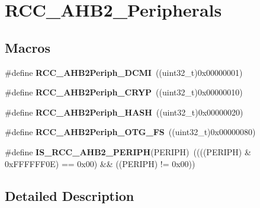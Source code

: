 \hypertarget{group___r_c_c___a_h_b2___peripherals}{}\section{R\+C\+C\+\_\+\+A\+H\+B2\+\_\+\+Peripherals}
\label{group___r_c_c___a_h_b2___peripherals}
\subsection*{Macros}
\begin{DoxyCompactItemize}
\item 
\mbox{\label{group___r_c_c___a_h_b2___peripherals_ga514e63d5f3ced29ca4014d84e269ea6e}} 
\#define {\bfseries R\+C\+C\+\_\+\+A\+H\+B2\+Periph\+\_\+\+D\+C\+MI}~((uint32\+\_\+t)0x00000001)
\item 
\mbox{\label{group___r_c_c___a_h_b2___peripherals_ga99893bb6ef0cc504fbbc6236ae883410}} 
\#define {\bfseries R\+C\+C\+\_\+\+A\+H\+B2\+Periph\+\_\+\+C\+R\+YP}~((uint32\+\_\+t)0x00000010)
\item 
\mbox{\label{group___r_c_c___a_h_b2___peripherals_gad235f25cf07339b1486e95adf4e2111c}} 
\#define {\bfseries R\+C\+C\+\_\+\+A\+H\+B2\+Periph\+\_\+\+H\+A\+SH}~((uint32\+\_\+t)0x00000020)
\item 
\mbox{\label{group___r_c_c___a_h_b2___peripherals_ga95977679051aa7428d823404bff63aea}} 
\#define {\bfseries R\+C\+C\+\_\+\+A\+H\+B2\+Periph\+\_\+\+O\+T\+G\+\_\+\+FS}~((uint32\+\_\+t)0x00000080)
\item 
\mbox{\label{group___r_c_c___a_h_b2___peripherals_ga90f3f337a5f503e36280ab4504d31c39}} 
\#define {\bfseries I\+S\+\_\+\+R\+C\+C\+\_\+\+A\+H\+B2\+\_\+\+P\+E\+R\+I\+PH}(P\+E\+R\+I\+PH)~((((P\+E\+R\+I\+PH) \& 0x\+F\+F\+F\+F\+F\+F0\+E) == 0x00) \&\& ((\+P\+E\+R\+I\+P\+H) != 0x00))
\end{DoxyCompactItemize}


\subsection{Detailed Description}
